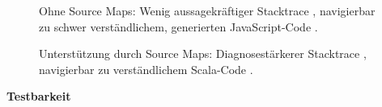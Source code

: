 \documentclass[a4paper, 12pt, hidelinks, listof=totoc, listoftables=totoc, bibliography=totoc]{scrreprt}
\newcommand{\MyMiniSec}[1]{\rmfamily\fontsize{12}{15}\selectfont
	\vspace{7pt}\textbf{#1} %
}
\begin{document}
\begin{figure}[!h]
	\centering
	\caption[Ohne Source Maps.]{Ohne Source Maps: Wenig aussagekräftiger Stacktrace \protect{}, navigierbar zu schwer verständlichem, generierten JavaScript-Code \protect{}.}
	\label{fig:no-sourcemaps}
\end{figure}

\begin{figure}[!h]
	\centering
	\caption[Unterstützung durch Source Maps.]{Unterstützung durch Source Maps: Diagnosestärkerer Stacktrace \protect{}, navigierbar zu verständlichem Scala-Code \protect{}.}
	\label{fig:sourcemaps}
\end{figure}


\MyMiniSec{Testbarkeit}
\end{document}
